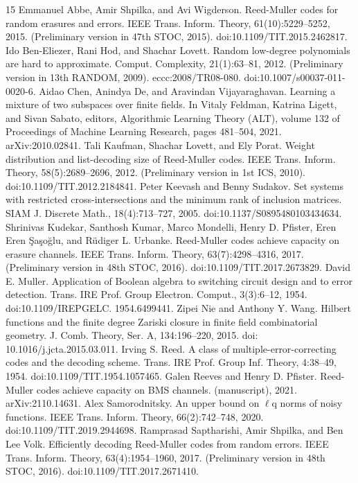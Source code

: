 \begin{thebibliography}{15}
 Emmanuel Abbe, Amir Shpilka, and Avi Wigderson. Reed-Muller codes for random erasures and errors. IEEE Trans. Inform. Theory, 61(10):5229–5252, 2015. (Preliminary version in 47th STOC, 2015). doi:10.1109/TIT.2015.2462817.
 Ido Ben-Eliezer, Rani Hod, and Shachar Lovett. Random low-degree polynomials are hard to approximate. Comput. Complexity, 21(1):63–81, 2012. (Preliminary version in 13th RANDOM, 2009). eccc:2008/TR08-080. doi:10.1007/s00037-011-0020-6.
 Aidao Chen, Anindya De, and Aravindan Vijayaraghavan. Learning a mixture of two subspaces over finite fields. In Vitaly Feldman, Katrina Ligett, and Sivan Sabato, editors, Algorithmic Learning Theory (ALT), volume 132 of Proceedings of Machine Learning Research, pages 481–504, 2021. arXiv:2010.02841.
 Tali Kaufman, Shachar Lovett, and Ely Porat. Weight distribution and list-decoding size of Reed-Muller codes. IEEE Trans. Inform. Theory, 58(5):2689–2696, 2012. (Preliminary version in 1st ICS, 2010). doi:10.1109/TIT.2012.2184841.
 Peter Keevash and Benny Sudakov. Set systems with restricted cross-intersections and the minimum rank of inclusion matrices. SIAM J. Discrete Math., 18(4):713–727, 2005. doi:10.1137/S0895480103434634.
 Shrinivas Kudekar, Santhosh Kumar, Marco Mondelli, Henry D. Pfister, Eren Eren Şaşoğlu, and Rüdiger L. Urbanke. Reed-Muller codes achieve capacity on erasure channels. IEEE Trans. Inform. Theory, 63(7):4298–4316, 2017. (Preliminary version in 48th STOC, 2016). doi:10.1109/TIT.2017.2673829.
 David E. Muller. Application of Boolean algebra to switching circuit design and to error detection. Trans. IRE Prof. Group Electron. Comput., 3(3):6–12, 1954. doi:10.1109/IREPGELC. 1954.6499441.
 Zipei Nie and Anthony Y. Wang. Hilbert functions and the finite degree Zariski closure in finite field combinatorial geometry. J. Comb. Theory, Ser. A, 134:196–220, 2015. doi: 10.1016/j.jcta.2015.03.011.
 Irving S. Reed. A class of multiple-error-correcting codes and the decoding scheme. Trans. IRE Prof. Group Inf. Theory, 4:38–49, 1954. doi:10.1109/TIT.1954.1057465.
 Galen Reeves and Henry D. Pfister. Reed-Muller codes achieve capacity on BMS channels. (manuscript), 2021. arXiv:2110.14631.
 Alex Samorodnitsky. An upper bound on $\ell$q norms of noisy functions. IEEE Trans. Inform. Theory, 66(2):742–748, 2020. doi:10.1109/TIT.2019.2944698.
 Ramprasad Saptharishi, Amir Shpilka, and Ben Lee Volk. Efficiently decoding Reed-Muller codes from random errors. IEEE Trans. Inform. Theory, 63(4):1954–1960, 2017. (Preliminary version in 48th STOC, 2016). doi:10.1109/TIT.2017.2671410.

\end{thebibliography}
